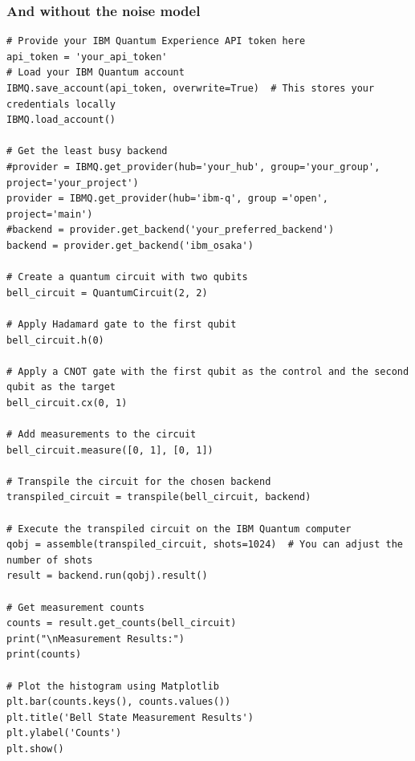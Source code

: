 \documentclass{beamer}
\begin{document}
\begin{frame}
\frametitle{And without the noise model}

\begin{verbatim}
# Provide your IBM Quantum Experience API token here
api_token = 'your_api_token'
# Load your IBM Quantum account
IBMQ.save_account(api_token, overwrite=True)  # This stores your credentials locally
IBMQ.load_account()

# Get the least busy backend
#provider = IBMQ.get_provider(hub='your_hub', group='your_group', project='your_project')
provider = IBMQ.get_provider(hub='ibm-q', group ='open', project='main')
#backend = provider.get_backend('your_preferred_backend')
backend = provider.get_backend('ibm_osaka')

# Create a quantum circuit with two qubits
bell_circuit = QuantumCircuit(2, 2)

# Apply Hadamard gate to the first qubit
bell_circuit.h(0)

# Apply a CNOT gate with the first qubit as the control and the second qubit as the target
bell_circuit.cx(0, 1)

# Add measurements to the circuit
bell_circuit.measure([0, 1], [0, 1])

# Transpile the circuit for the chosen backend
transpiled_circuit = transpile(bell_circuit, backend)

# Execute the transpiled circuit on the IBM Quantum computer
qobj = assemble(transpiled_circuit, shots=1024)  # You can adjust the number of shots
result = backend.run(qobj).result()

# Get measurement counts
counts = result.get_counts(bell_circuit)
print("\nMeasurement Results:")
print(counts)

# Plot the histogram using Matplotlib
plt.bar(counts.keys(), counts.values())
plt.title('Bell State Measurement Results')
plt.ylabel('Counts')
plt.show()

\end{verbatim}
\end{frame}
\end{document}
